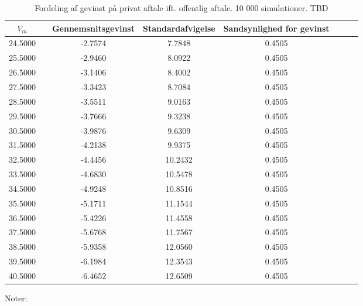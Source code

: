 \documentclass{article}
\begin{document}


\begin{table}[h]
	\caption{Fordeling af gevinst p\aa{} privat aftale ift. offentlig aftale. 10 000 simulationer. TBD}
	\label{tab:rel_fordeling}
	\begin{tabularx}{\linewidth}{cXcccccr}
	\toprule[1pt]
	$V_m$ && Gennemsnitsgevinst & Standardafvigelse & Sandsynlighed for gevinst\\
	\hline 
24.5000&&-2.7574& 7.7848& 0.4505 \\
25.5000&&-2.9460& 8.0922& 0.4505\\
26.5000&&-3.1406& 8.4002& 0.4505\\
27.5000&&-3.3423& 8.7084& 0.4505\\
28.5000&&-3.5511& 9.0163& 0.4505\\
29.5000&&-3.7666& 9.3238& 0.4505\\
30.5000&&-3.9876& 9.6309& 0.4505\\
31.5000&&-4.2138& 9.9375& 0.4505\\
32.5000&&-4.4456&10.2432& 0.4505\\
33.5000&&-4.6830&10.5478& 0.4505\\
34.5000&&-4.9248&10.8516& 0.4505\\
35.5000&&-5.1711&11.1544& 0.4505\\
36.5000&&-5.4226&11.4558& 0.4505\\
37.5000&&-5.6768&11.7567& 0.4505\\
38.5000&&-5.9358&12.0560& 0.4505\\
39.5000&&-6.1984&12.3543& 0.4505\\
40.5000&&-6.4652&12.6509& 0.4505\\
		\bottomrule[1pt]
	\end{tabularx}
	\begin{minipage}{\linewidth}
		\footnotesize{Noter: }
	\end{minipage}
\end{table}
\end{document}

